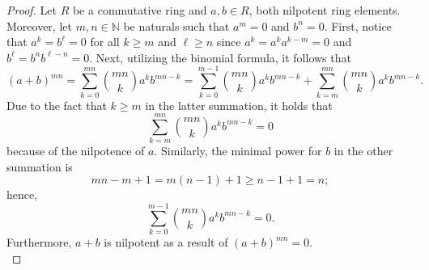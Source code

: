 \documentclass[ 12pt ]{article}
\begin{document}
\begin{enumerate}
		\begin{proof}
			Let $R$ be a commutative ring and $a, b \in R$, both nilpotent ring elements. Moreover, let $m, n \in \mathbb{N}$ be naturals such that $a^m = 0$ and $b^n = 0$. First, notice that $a^k = b^\ell = 0$ for all $k \geq m$ and $\ell \geq n$ since $a^k = a^k a^{k - m} = 0$ and $b^\ell = b^n b^{\ell - n} = 0$. Next, utilizing the binomial formula, it follows that $$(a + b)^{mn} = \sum_{k = 0}^{mn} \binom{mn}{k} a^k b^{mn - k} = \sum_{k = 0}^{m - 1} \binom{mn}{k} a^k b^{mn - k} + \sum_{k = m}^{mn} \binom{mn}{k} a^k b^{mn - k}.$$ Due to the fact that $k \geq m$ in the latter summation, it holds that $$\sum_{k = m}^{mn} \binom{mn}{k} a^k b^{mn - k} = 0$$ because of the nilpotence of $a$. Similarly, the minimal power for $b$ in the other summation is $$mn - m + 1 = m(n - 1) + 1 \geq n - 1 + 1 = n;$$ hence, $$\sum_{k = 0}^{m - 1} \binom{mn}{k} a^k b^{mn - k} = 0.$$ Furthermore, $a + b$ is nilpotent as a result of $(a + b)^{mn} = 0$. \\


\end{proof}
\end{enumerate}
\end{document}
